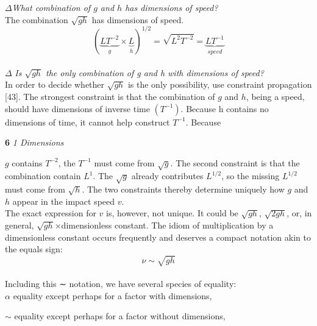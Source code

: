 \documentclass[a4paper]{article}
\begin{document}
$\Delta$\textit {What combination of $g$ and $h$ has dimensions of speed?}
\\

The combination $\sqrt{gh}$ has dimensions of speed.
\\

\begin{equation}
(\underbrace{LT^{−2}}_{g}\times \underbrace{L}_{h})^{1/2}=\sqrt{L^2T^{-2}}=\underbrace{LT^{-1}}_{speed}
\end{equation}
\\

$\Delta$ \textit {Is $\sqrt{gh}$ the only combination of g and h with dimensions of speed?}
\\

{\large In order to decide whether $\sqrt{gh}$ is the only possibility, use constraint
propagation [43]. The strongest constraint is that the combination of $g$ and
$h$, being a speed, should have dimensions of inverse time $(T^{−1})$. Because
h contains no dimensions of time, it cannot help construct $T^{−1}$. Because}


\newpage
 \large\textbf{6} \hfill \textit{1 Dimensions} \\ 
\vspace{0pt} 

$g$ contains $T^{−2}$, the $T^{−1}$ must come from $\sqrt{g}$. The second constraint is
that the combination contain $L^{1}$. The $\sqrt{g}$ already contributes $L^{1/2}$, so the
missing $L^{1/2}$ must come from $\sqrt{h}$. The two constraints thereby determine
uniquely how $g$ and $h$ appear in the impact speed $v$.
\\

The exact expression for $v$ is, however, not unique. It could be $\sqrt{gh}$,
$\sqrt{2gh}$,
or, in general, $\sqrt{gh}$×dimensionless constant. The idiom of multiplication
by a dimensionless constant occurs frequently and deserves a compact
notation akin to the equals sign:
\\

\begin{equation}
\nu \sim \sqrt{gh} 
\end{equation}
\\

Including this ∼ notation, we have several species of equality:
\\

$\alpha$ equality except perhaps for a factor with dimensions,

$\sim$ equality except perhaps for a factor without dimensions,
\end{document}
